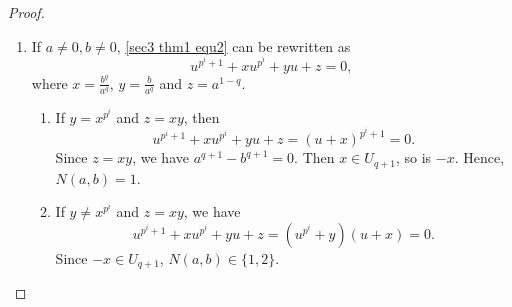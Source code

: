 \documentclass[sn-mathphys-num]{sn-jnl}%
\theoremstyle{thmstyleone}%
\theoremstyle{thmstyletwo}%
\theoremstyle{thmstylethree}%
\begin{document}
\begin{proof}
\begin{enumerate}[label = \bf Case \arabic*:, leftmargin=4.1em]
		\item If $a\ne0,b\ne0$, \cref{sec3 thm1 equ2} can be rewritten as
		\begin{equation*}
			u^{p^i+1}+xu^{p^i}+yu+z=0,
		\end{equation*}
		where $x=\frac{b^q}{a^q}$, $y=\frac{b}{a^q}$ and $z=a^{1-q}$. 
		\begin{enumerate}[label=\bf Case 3.\arabic*:]
			\item If $y= x^{p^i}$ and $z=xy$, then
			\begin{equation*}
				u^{p^i+1}+xu^{p^i}+yu+z=\left(u+x\right)^{p^i+1}=0.
			\end{equation*}
			Since $z=xy$, we have $a^{q+1}-b^{q+1}=0$. Then $x \in U_{q+1}$, so is $-x$. Hence, $N(a,b)=1$.
			
			\item If $y\ne x^{p^i}$ and $z=xy$, we have
			\begin{equation*}
				u^{p^i+1}+xu^{p^i}+yu+z=\left(u^{p^i}+y\right)\left(u+x\right)=0.
			\end{equation*}
			Since $-x\in U_{q+1}$, $N(a,b)\in \{1,2\}$.
			

\end{enumerate}
\end{enumerate}
\end{proof}
\end{document}

